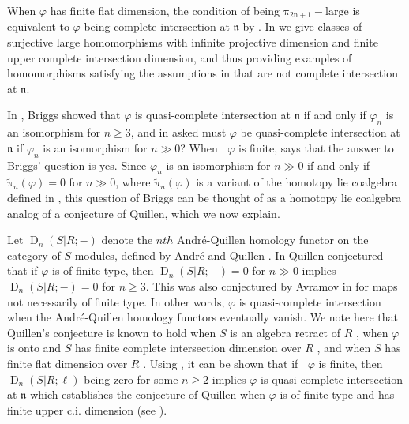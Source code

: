 \documentclass{amsart}
\theoremstyle{definition}
\DeclareMathOperator{\uppercidim}{CI^{*}dim}
\newcommand{\daq}[4]{\operatorname{D}_{#1}(#2|#3;#4)}
\newcommand{\n}{\mathfrak{n}}
\newcommand{\wpi}{\widetilde{\pi}}
\newcommand{\pil}[1]{\operatorname{\pi_{#1}-large}}
\begin{document}
When $\varphi$ has finite flat dimension, the condition of being $\pil{2n+1}$ is equivalent to $\varphi$ being complete intersection at $\n$ by . In  we give classes of surjective large homomorphisms with infinite projective dimension and finite upper complete intersection dimension, and thus providing examples of homomorphisms satisfying the assumptions in  that are not complete intersection at $\n$. 

In \cite[Theorem 33]{Briggs:2018}, Briggs showed that $\varphi$ is quasi-complete intersection at $\n$ if and only if $\varphi_{n}$ is an isomorphism for $n\geq 3$, and in \cite[Question on page 85]{Briggs:2018} asked must $\varphi$ be quasi-complete intersection at $\n$ if $\varphi_{n}$ is an isomorphism for $n\gg 0$? When $\uppercidim{\varphi}$ is finite,  says that the answer to Briggs' question is yes. Since $\varphi_{n}$ is an isomorphism for $n\gg 0$ if and only if $\wpi_{n}(\varphi) = 0$ for $n\gg 0$, where $\wpi_{n}(\varphi)$ is a variant of the homotopy lie coalgebra defined in \cite{Briggs:2018}, this question of Briggs can be thought of as a homotopy lie coalgebra analog of a conjecture of Quillen, which we now explain.

Let $\daq{n}{S}{R}{-}$ denote the $nth$ Andr\'e-Quillen homology functor on the category of $S$-modules, defined by Andr\'e \cite{Andre:1971} and Quillen \cite{Quillen:1970}. In \cite[Conjecture 5.6]{Quillen:1970} Quillen conjectured that if $\varphi$ is of finite type, then $\daq{n}{S}{R}{-}=0$ for $n\gg0$ implies $\daq{n}{S}{R}{-}=0$ for $n\geq 3$. This was also conjectured by Avramov in \cite[pg. 459]{Avramov:1999} for maps not necessarily of finite type. In other words, $\varphi$ is quasi-complete intersection when the Andr\'e-Quillen homology functors eventually vanish. We note here that Quillen's conjecture is known to hold when $S$ is an algebra retract of $R$ \cite{Avramov/Iyengar:2003}, when $\varphi$ is onto and $S$ has finite complete intersection dimension over $R$ \cite[Proposition 10]{Soto:2000}, and when $S$ has finite flat dimension over $R$ \cite{Avramov:1999}. Using \cite{Briggs/Iyengar:2020}, it can be shown that if $\uppercidim{\varphi}$ is finite, then $\daq{n}{S}{R}{\ell}$ being zero for some $n\geq 2$ implies $\varphi$ is quasi-complete intersection at $\n$ which establishes the conjecture of Quillen  when $\varphi$ is of finite type and has finite upper c.i. dimension (see ). 
\end{document}
